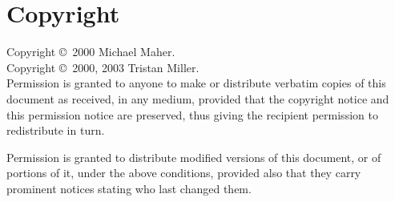\documentclass[a4paper,10pt,twocolumn]{article}
\begin{document}
\appendix

\section{Copyright}

Copyright \copyright~2000 Michael Maher.\\
Copyright \copyright~2000, 2003 Tristan Miller.\\

\noindent Permission is granted to anyone to make or distribute
verbatim copies of this document as received, in any medium, provided
that the copyright notice and this permission notice are preserved,
thus giving the recipient permission to redistribute in turn.

Permission is granted to distribute modified versions of this
document, or of portions of it, under the above conditions, provided
also that they carry prominent notices stating who last changed them.
\end{document}
